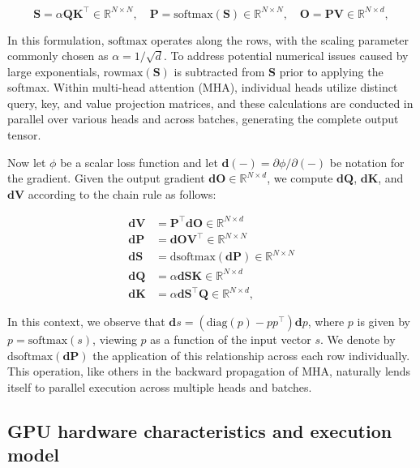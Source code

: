 \begin{equation*}
  \mathbf{S} = \alpha \mathbf{Q} \mathbf{K}^\top \in \mathbb{R}^{N \times N}, \quad \mathbf{P} = \mathrm{softmax}(\mathbf{S}) \in \mathbb{R}^{N \times N}, \quad \mathbf{O} = \mathbf{P}\mathbf{V} \in \mathbb{R}^{N \times d},
\end{equation*}

In this formulation, $\mathrm{softmax}$ operates along the rows, with the scaling parameter commonly chosen as $\alpha = 1/\sqrt{d}$. To address potential numerical issues caused by large exponentials, $\mathrm{rowmax}(\mathbf{S})$ is subtracted from $\mathbf{S}$ prior to applying the softmax. Within multi-head attention (MHA), individual heads utilize distinct query, key, and value projection matrices, and these calculations are conducted in parallel over various heads and across batches, generating the complete output tensor.

Now let $\phi$ be a scalar loss function and let $\mathbf{d}(-) = \partial \phi / \partial (-)$ be notation for the gradient. Given the output gradient $\mathbf{dO} \in \mathbb{R}^{N \times d}$, we compute $\mathbf{dQ}$, $\mathbf{dK}$, and $\mathbf{dV}$ according to the chain rule as follows:

\begin{align*}
  \mathbf{dV} &= \mathbf{P}^\top \mathbf{dO} \in \mathbb{R}^{N \times d} \\
  \mathbf{dP} &= \mathbf{dO} \mathbf{V}^\top \in \mathbb{R}^{N \times N} \\
  \mathbf{dS} &= \mathrm{dsoftmax} (\mathbf{dP}) \in \mathbb{R}^{N \times N} \\
  \mathbf{dQ} &= \alpha \mathbf{dS} \mathbf{K} \in \mathbb{R}^{N \times d} \\
  \mathbf{dK} &= \alpha \mathbf{dS}^\top \mathbf{Q} \in \mathbb{R}^{N \times d},
\end{align*}

In this context, we observe that $\mathbf{d}s = (\mathrm{diag}(p) - p p^\top)\mathbf{d}p$, where $p$ is given by $p = \mathrm{softmax}(s)$, viewing $p$ as a function of the input vector $s$. We denote by $\mathrm{dsoftmax}(\mathbf{dP})$ the application of this relationship across each row individually. This operation, like others in the backward propagation of MHA, naturally lends itself to parallel execution across multiple heads and batches.

\subsection{GPU hardware characteristics and execution model}
\label{subsec:hardware}

